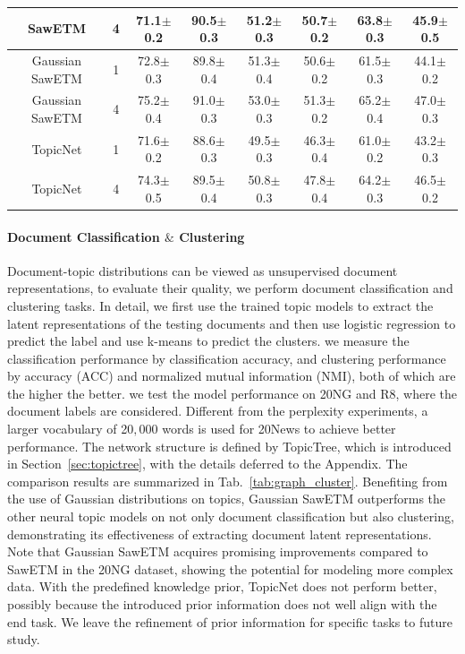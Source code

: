 \documentclass{article}
\begin{document}
\begin{table}
{\begin{tabular}{c|c|cc|cc|cc}
    SawETM \cite{duan2021sawtooth}& 4 &71.1$\pm$0.2 &90.5$\pm$0.3 &51.2$\pm$0.3 &50.7$\pm$0.2 &63.8$\pm$0.3 &45.9$\pm$0.5 \\
    \midrule
    Gaussian SawETM& 1  &72.8$\pm$0.3 &89.8$\pm$0.4 
    &51.3$\pm$0.4 &50.6$\pm$0.2 &61.5$\pm$0.3 &44.1$\pm$0.2 \\
    Gaussian SawETM& 4   &75.2$\pm$0.4 &91.0$\pm$0.3
    &53.0$\pm$0.3 &51.3$\pm$0.2 &65.2$\pm$0.4 &47.0$\pm$0.3 \\ 
    \midrule
   TopicNet& 1  &71.6$\pm$0.2&88.6$\pm$0.3 & 49.5$\pm$0.3 &46.3$\pm$0.4 & 61.0$\pm$0.2& 43.2$\pm$0.3\\
   TopicNet& 4  &74.3$\pm$0.5&89.5$\pm$0.4 & 50.8$\pm$ 0.3& 47.8$\pm$0.4&64.2$\pm$0.3&46.5$\pm$0.2 \\
  \bottomrule
  \end{tabular}}
\end{table}
\paragraph{Document Classification $\&$ Clustering}
Document-topic distributions can be viewed as unsupervised document representations, to evaluate their quality, we perform document classification and clustering tasks. In detail, we first use the trained topic models to extract the latent representations of the testing documents and then use logistic regression to predict the label and use k-means to predict the clusters. we measure the classification performance by classification accuracy, and clustering performance by accuracy (ACC) and normalized mutual information (NMI), both of which are the higher the better. we test the model performance on 20NG and R8, where the document labels are considered. Different from the perplexity experiments, a larger vocabulary of 20$,$000 words is used for 20News to achieve better performance. The network structure is defined by TopicTree, which is introduced in Section~\ref{sec:topictree}, with the details  deferred to the Appendix. The comparison results are summarized in Tab.~\ref{tab:graph_cluster}. Benefiting from the use of Gaussian distributions on topics, Gaussian SawETM outperforms the other neural topic models on not only  document classification  but also clustering, demonstrating its effectiveness of extracting document latent representations. Note that Gaussian SawETM acquires promising improvements compared to SawETM in the 20NG dataset, showing the potential for modeling more complex data. With the predefined knowledge prior, TopicNet does not perform better, possibly because the introduced prior information does not well align with the end task. We leave the refinement of prior information for specific tasks to future study.
\end{document}
